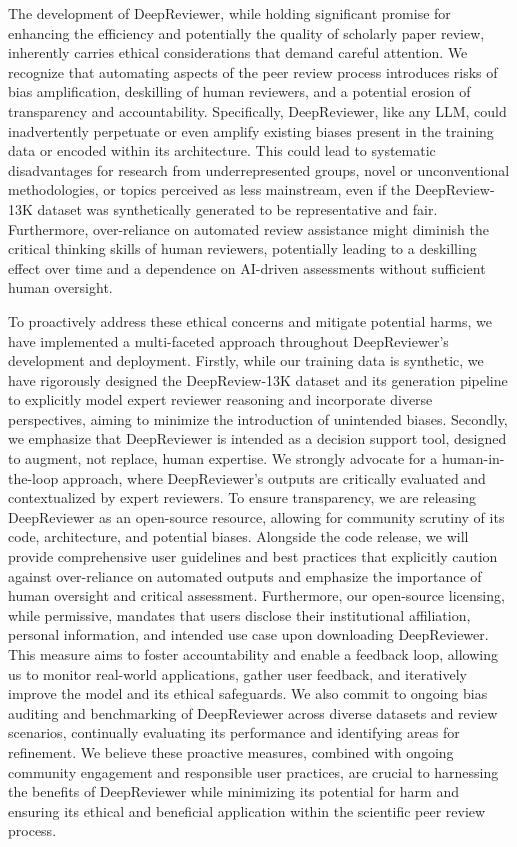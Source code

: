 \documentclass{article}
\begin{document}
The development of DeepReviewer, while holding significant promise for enhancing the efficiency and potentially the quality of scholarly paper review, inherently carries ethical considerations that demand careful attention. We recognize that automating aspects of the peer review process introduces risks of bias amplification, deskilling of human reviewers, and a potential erosion of transparency and accountability. Specifically, DeepReviewer, like any LLM, could inadvertently perpetuate or even amplify existing biases present in the training data or encoded within its architecture. This could lead to systematic disadvantages for research from underrepresented groups, novel or unconventional methodologies, or topics perceived as less mainstream, even if the DeepReview-13K dataset was synthetically generated to be representative and fair. Furthermore, over-reliance on automated review assistance might diminish the critical thinking skills of human reviewers, potentially leading to a deskilling effect over time and a dependence on AI-driven assessments without sufficient human oversight.

To proactively address these ethical concerns and mitigate potential harms, we have implemented a multi-faceted approach throughout DeepReviewer's development and deployment. Firstly, while our training data is synthetic, we have rigorously designed the DeepReview-13K dataset and its generation pipeline to explicitly model expert reviewer reasoning and incorporate diverse perspectives, aiming to minimize the introduction of unintended biases. Secondly, we emphasize that DeepReviewer is intended as a decision support tool, designed to augment, not replace, human expertise. We strongly advocate for a human-in-the-loop approach, where DeepReviewer's outputs are critically evaluated and contextualized by expert reviewers. To ensure transparency, we are releasing DeepReviewer as an open-source resource, allowing for community scrutiny of its code, architecture, and potential biases. Alongside the code release, we will provide comprehensive user guidelines and best practices that explicitly caution against over-reliance on automated outputs and emphasize the importance of human oversight and critical assessment. Furthermore, our open-source licensing, while permissive, mandates that users disclose their institutional affiliation, personal information, and intended use case upon downloading DeepReviewer. This measure aims to foster accountability and enable a feedback loop, allowing us to monitor real-world applications, gather user feedback, and iteratively improve the model and its ethical safeguards. We also commit to ongoing bias auditing and benchmarking of DeepReviewer across diverse datasets and review scenarios, continually evaluating its performance and identifying areas for refinement. We believe these proactive measures, combined with ongoing community engagement and responsible user practices, are crucial to harnessing the benefits of DeepReviewer while minimizing its potential for harm and ensuring its ethical and beneficial application within the scientific peer review process.
\end{document}
